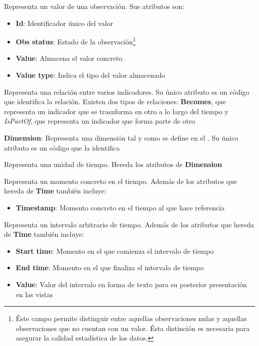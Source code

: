 \begin{description}
\begin{itemize}
		\end{itemize}
	\item[Value]  Representa un valor de una observación.  Sus atributos son:
		\begin{itemize}
			\item \textbf{Id}:  Identificador único del valor
			\item \textbf{Obs status}:  Estado de la observación\footnote{Éste campo permite distinguir entre aquellas observaciones nulas y aquellas observaciones que no cuentan con un valor.  Ésta distinción es necesaria para asegurar la calidad estadística de los datos.}
			\item \textbf{Value}:  Almacena el valor concreto
			\item \textbf{Value type}:  Indica el tipo del valor almacenado
		\end{itemize}
	\item[IndicatorRelationship]  Representa una relación entre varios indicadores.  Su único atributo es un código que identifica la relación.  Existen dos tipos de relaciones:  \textbf{Becomes}, que representa un indicador que se trasnforma en otro a lo largo del tiempo y \textit{IsPartOf}, que representa un indicador que forma parte de otro
	\item \textbf{Dimension}:  Representa una dimensión tal y como se define en el .  Su único atributo es un código que la identifica
	\item[Time]  Representa una unidad de tiempo.  Hereda los atributos de \textbf{Dimension}
	\item[Instant]  Representa un momento concreto en el tiempo.  Además de los atributos que hereda de \textbf{Time} también incluye:
	\begin{itemize}
		\item \textbf{Timestamp}:  Momento concreto en el tiempo al que hace referencia
	\end{itemize}
	\item[Interval]  Representa un intervalo arbitrario de tiempo.  Además de los atributos que hereda de \textbf{Time} también incluye:
	\begin{itemize}
		\item \textbf{Start time}:  Momento en el que comienza el intervalo de tiempo
		\item \textbf{End time}:  Momento en el que finaliza el intervalo de tiempo
		\item \textbf{Value}:  Valor del intervalo en forma de texto para su posterior presentación en las vistas

\end{itemize}
\end{description}
